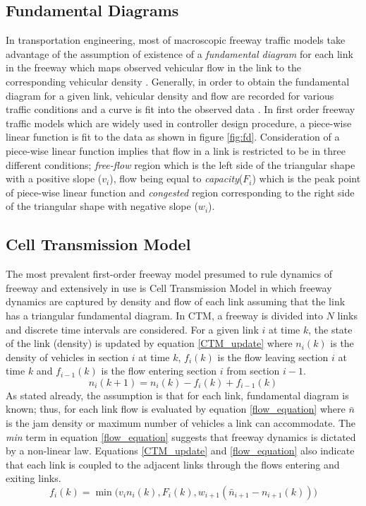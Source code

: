 \documentclass[twocolumn,10pt]{asme2e}
\begin{document}
\subsection{Fundamental Diagrams}
In transportation engineering, most of macroscopic freeway traffic models take advantage of the assumption of existence of a \textit{fundamental diagram }for each link in the freeway which maps observed vehicular flow in the link to the corresponding vehicular density \cite{Calibration}. Generally, in order to obtain the fundamental diagram for a given link, vehicular density and flow are recorded for various traffic conditions and a curve is fit into the observed data \cite{cassidy}. In first order freeway traffic models which are widely used in controller design procedure, a piece-wise linear function is fit to the data as shown in figure \ref{fig:fd}. Consideration of a piece-wise linear function implies that flow in a link is restricted to be in three different conditions; \textit{free-flow} region which is the left side of the triangular shape with a positive slope ($v_i$), flow being equal to \textit{capacity}($F_i$) which is the peak point of piece-wise linear function and \textit{congested} region corresponding to the right side of the triangular shape with negative slope ($w_i$).
\subsection{Cell Transmission Model}
The most prevalent first-order freeway model presumed to rule dynamics of freeway and extensively in use is Cell Transmission Model \cite{CTM} in which freeway dynamics are captured by density and flow of each link assuming that the link has a triangular fundamental diagram. In CTM, a freeway is divided into $N$ links and discrete time intervals are considered. For a given link $i$ at time $k$, the state of the link (density) is updated by equation \ref{CTM_update} where $n_i(k)$ is the density of vehicles in section $i$ at time $k$, $f_i(k)$ is the flow leaving section $i$ at time $k$ and  $f_{i-1}(k)$ is the flow entering section $i$ from section $i-1$. 
\begin{equation} \label{CTM_update}
n_i(k+1) = n_i(k) - f_i(k) + f_{i-1}(k)
\end{equation}
As stated already, the assumption is that for each link, fundamental diagram is known; thus, for each link flow is evaluated by equation \ref{flow_equation} where $\bar{n}$ is the jam density or maximum number of vehicles a link can accommodate. The \textit{min} term in equation \ref{flow_equation} suggests that freeway dynamics is dictated by a non-linear law. Equations \ref{CTM_update} and \ref{flow_equation} also indicate that each link is coupled to the adjacent links through the flows entering and exiting links. 
\begin{equation} \label{flow_equation}
f_i(k) = \min \big( v_in_i(k), F_i(k), w_{i+1}(\bar{n}_{i+1} - n_{i+1}(k))\big)
\end{equation}
\end{document}
